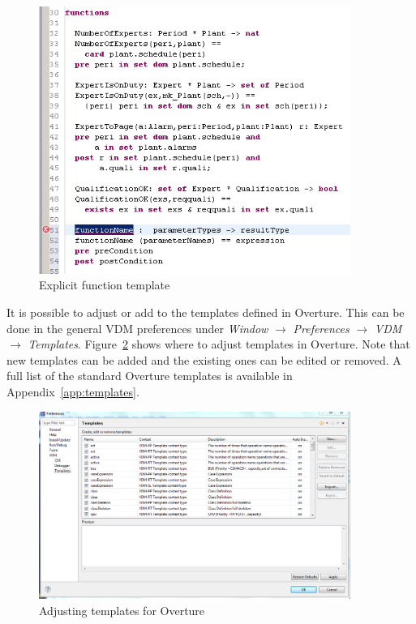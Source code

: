 \documentclass{overturerepchap}
\begin{document}
\begin{figure}
\begin{center}
\includegraphics[width=4in]{figures/FunctionTemplate}
\caption{Explicit function template}
\label{fig:functionTemplate}
\end{center}
\end{figure}

It is possible to adjust or add to the templates defined in
Overture. This can be done in the general VDM preferences under
\emph{Window} $\rightarrow$ \emph{Preferences} $\rightarrow$ \emph{VDM}
$\rightarrow$ \emph{Templates}. Figure~\ref{fig:Templatepreferences} shows
where to adjust templates in Overture. Note
that new templates can be added and the existing ones can be
edited or removed. A full list of the
standard Overture templates is available in Appendix~\ref{app:templates}.

\begin{figure}
\begin{center}
\includegraphics[width=4in]{screenDumps/templatesRT}
\caption{Adjusting templates for Overture}
\label{fig:Templatepreferences}
\end{center}
\end{figure}
\end{document}
